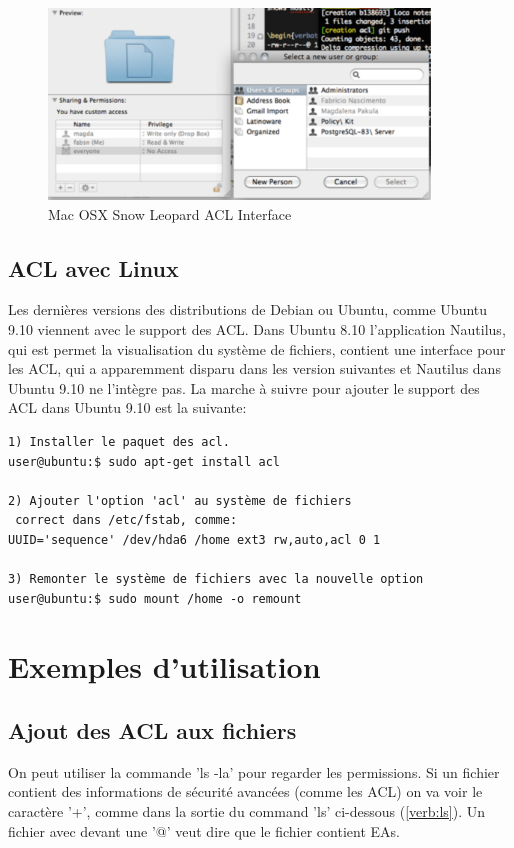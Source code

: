 \documentclass{article}
\begin{document}
\begin{figure}[htbp]
	\centering
		\includegraphics[height=2in]{img/mac-acl.pdf}
	\caption{Mac OSX Snow Leopard ACL Interface}
	\label{fig:img_mac-acl}
\end{figure}

\subsection{ACL avec Linux}


Les dernières versions des distributions de Debian ou Ubuntu, comme Ubuntu 9.10 viennent avec le support des ACL. Dans Ubuntu 8.10 l'application Nautilus, qui est permet la visualisation du système de fichiers, contient une interface pour les ACL, qui a apparemment disparu dans les version suivantes et Nautilus dans Ubuntu 9.10 ne l'intègre pas. La marche à suivre pour ajouter le support des ACL dans Ubuntu 9.10 est la suivante:

\begin{verbatim}
1) Installer le paquet des acl. 
user@ubuntu:$ sudo apt-get install acl

2) Ajouter l'option 'acl' au système de fichiers
 correct dans /etc/fstab, comme:
UUID='sequence' /dev/hda6 /home ext3 rw,auto,acl 0 1

3) Remonter le système de fichiers avec la nouvelle option
user@ubuntu:$ sudo mount /home -o remount

\end{verbatim}

\section{Exemples d'utilisation}
\subsection{Ajout des ACL aux fichiers}

On peut utiliser la commande 'ls -la' pour regarder les permissions. Si un fichier contient des informations de sécurité avancées (comme les ACL) on va voir le caractère '+', comme dans la sortie du command 'ls' ci-dessous (\ref{verb:ls}). Un fichier avec devant une '@' veut dire que le fichier contient EAs. 
\end{document}
